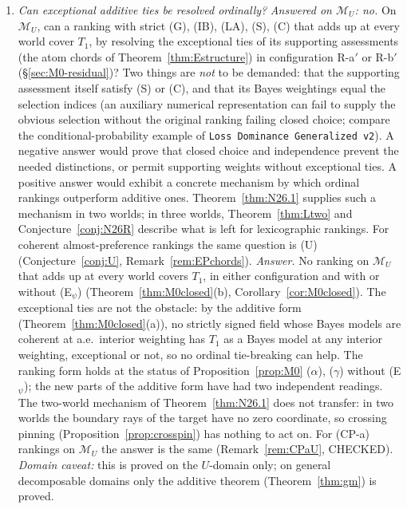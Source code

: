 \documentclass[11pt]{article}
\theoremstyle{definition}
\theoremstyle{remark}
\newcommand{\M}{\mathcal M}
\newcommand{\src}[1]{\texttt{#1}}
\begin{document}
\begin{enumerate}[leftmargin=*,label=\textbf{(Q\arabic*)}]
\item \emph{Can exceptional additive ties be resolved ordinally?} \emph{Answered on $\M_U$: no.} On $\M_U$, can a ranking with strict (G), (IB), (LA), (S), (C) that adds up at every world cover $T_1$, by resolving the exceptional ties of its supporting assessments (the atom chords of Theorem~\ref{thm:Estructure}) in configuration R-a$'$ or R-b$'$ (\S\ref{sec:M0-residual})? Two things are \emph{not} to be demanded: that the supporting assessment itself satisfy (S) or (C), and that its Bayes weightings equal the selection indices (an auxiliary numerical representation can fail to supply the obvious selection without the original ranking failing closed choice; compare the conditional-probability example of \src{Loss Dominance Generalized v2}). A negative answer would prove that closed choice and independence prevent the needed distinctions, or permit supporting weights without exceptional ties. A positive answer would exhibit a concrete mechanism by which ordinal rankings outperform additive ones. Theorem~\ref{thm:N26.1} supplies such a mechanism in two worlds; in three worlds, Theorem~\ref{thm:Ltwo} and Conjecture~\ref{conj:N26R} describe what is left for lexicographic rankings. For coherent almost-preference rankings the same question is (U) (Conjecture~\ref{conj:U}, Remark~\ref{rem:EPchords}).
\emph{Answer.} No ranking on $\M_U$ that adds up at every world covers $T_1$, in either configuration and with or without (E$_\psi$) (Theorem~\ref{thm:M0closed}(b), Corollary~\ref{cor:M0closed}). The exceptional ties are not the obstacle: by the additive form (Theorem~\ref{thm:M0closed}(a)), no strictly signed field whose Bayes models are coherent at a.e.\ interior weighting has $T_1$ as a Bayes model at any interior weighting, exceptional or not, so no ordinal tie-breaking can help. The ranking form holds at the status of Proposition~\ref{prop:M0} ($\alpha$), ($\gamma$) without (E$_\psi$); the new parts of the additive form have had two independent readings. The two-world mechanism of Theorem~\ref{thm:N26.1} does not transfer: in two worlds the boundary rays of the target have no zero coordinate, so crossing pinning (Proposition~\ref{prop:crosspin}) has nothing to act on. For (CP-a) rankings on $\M_U$ the answer is the same (Remark~\ref{rem:CPaU}, CHECKED). \emph{Domain caveat:} this is proved on the $U$-domain only; on general decomposable domains only the additive theorem (Theorem~\ref{thm:gm}) is proved.

\end{enumerate}
\end{document}
